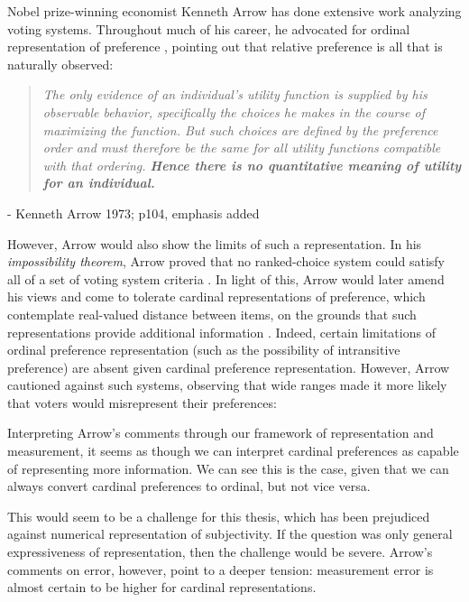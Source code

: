 \bigskip

Nobel prize-winning economist Kenneth Arrow has done extensive work analyzing voting systems.
Throughout much of his career, he advocated for ordinal representation of preference \citep{bianchi}, pointing out that relative preference is all that is naturally observed:

\begin{center}
	\begin{quotation}
\textit{
	The only evidence of an individual's utility function is supplied by his observable behavior, specifically the choices he makes in the course of maximizing the function.
	But such choices are defined by the preference order and must therefore be the same for all utility functions compatible with that ordering.
	\textbf{Hence there is no quantitative meaning of utility for an individual.}
	}
\end{quotation}
- Kenneth Arrow 1973; p104, emphasis added
\end{center}

However, Arrow would also show the limits of such a representation.
In his \textit{impossibility theorem}, Arrow proved that no ranked-choice system could satisfy all of a set of voting system criteria \citep{arrow}.
In light of this, Arrow would later amend his views and come to tolerate cardinal representations of preference, which contemplate real-valued distance between items, on the grounds that such representations provide additional information \citep{hamlin}.
Indeed, certain limitations of ordinal preference representation (such as the possibility of intransitive preference) are absent given cardinal preference representation.
However, Arrow cautioned against such systems, observing that wide ranges made it more likely that voters would misrepresent their preferences: 

Interpreting Arrow's comments through our framework of representation and measurement, it seems as though we can interpret cardinal preferences as capable of representing more information.
We can see this is the case, given that we can always convert cardinal preferences to ordinal, but not vice versa.

This would seem to be a challenge for this thesis, which has been prejudiced against numerical representation of subjectivity.
If the question was only general expressiveness of representation, then the challenge would be severe.
Arrow's comments on error, however, point to a deeper tension: measurement error is almost certain to be higher for cardinal representations.

